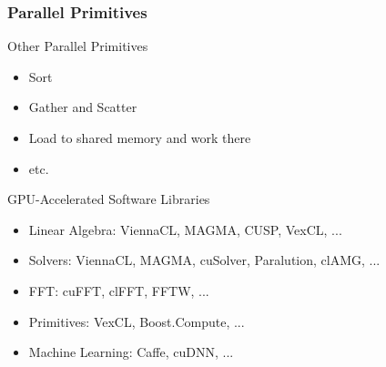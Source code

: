 \begin{frame}[fragile]
\frametitle{Parallel Primitives}

 \begin{block}{Other Parallel Primitives}
  \begin{itemize}
   \item Sort
   \item Gather and Scatter
   \item Load to shared memory and work there
   \item etc.
  \end{itemize}
 \end{block}

 \begin{block}{GPU-Accelerated Software Libraries}
  \begin{itemize}
   \item Linear Algebra: ViennaCL, MAGMA, CUSP, VexCL, ...
   \item Solvers: ViennaCL, MAGMA, cuSolver, Paralution, clAMG, ...
   \item FFT: cuFFT, clFFT, FFTW, ...
   \item Primitives: VexCL, Boost.Compute, ...
   \item Machine Learning: Caffe, cuDNN, ...
  \end{itemize}
 \end{block}

\end{frame}

